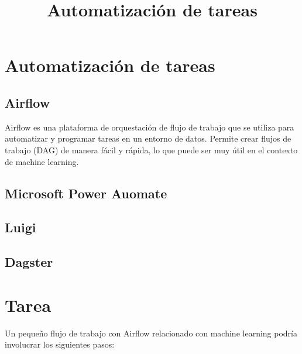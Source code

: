 \documentclass[11pt]{article}
\date{}
\title{Automatización de tareas}
\begin{document}
\maketitle
\setcounter{tocdepth}{4}
\tableofcontents

\setlength\parindent{10pt}



\section{Automatización de tareas}
\label{sec:orgf641fbc}

\subsection{Airflow}
\label{sec:orgccca450}
Airflow es una plataforma de orquestación de flujo de trabajo que se
utiliza para automatizar y programar tareas en un entorno de
datos. Permite crear flujos de trabajo (DAG) de manera fácil y rápida,
lo que puede ser muy útil en el contexto de machine learning.

\subsection{Microsoft Power Auomate}
\label{sec:org8054020}
\subsection{Luigi}
\label{sec:org6795d89}
\subsection{Dagster}
\label{sec:org1a4d3f1}


\section{Tarea}
\label{sec:org4c16067}
Un pequeño flujo de trabajo con Airflow relacionado con machine
learning podría involucrar los siguientes pasos:
\end{document}

